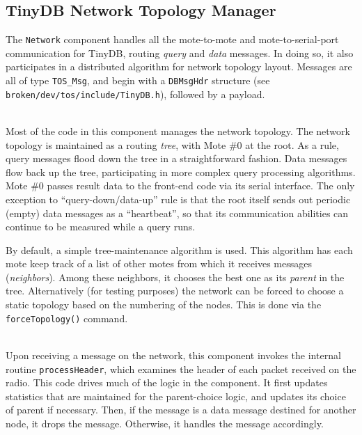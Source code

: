 \documentclass[11pt]{article}
\newcommand{\docroot}{broken/dev}
\begin{document}
\subsection{TinyDB Network Topology Manager}
\label{sec:tinydbnetwork}
The {\tt Network} component handles all the mote-to-mote and mote-to-serial-port
communication for TinyDB, routing {\em query} and {\em data} messages.
In doing so, it also participates in a distributed algorithm for
network topology layout.  Messages are all of type {\tt TOS\_Msg},
and begin with a {\tt DBMsgHdr} structure (see {\tt
\docroot/tos/include/TinyDB.h}), followed by a payload.

\vspace{1em}
\\ Most of the code in this
component manages the network topology.  The network topology is
maintained as a routing {\em tree}, with Mote \#0 at the root.  As a
rule, query messages flood down the tree in a straightforward fashion.
Data messages flow back up the tree, participating in more complex
query processing algorithms.  Mote \#0 passes result data to the
front-end code via its serial interface.  The only exception to
``query-down/data-up'' rule is that the root itself sends out periodic
(empty) data messages as a ``heartbeat'', so that its communication
abilities can continue to be measured while a query runs.

By default, a simple tree-maintenance algorithm is used.  This
algorithm has each mote keep track of a list of other motes from which
it receives messages ({\em neighbors}).  Among these neighbors, it
chooses the best one as its {\em parent} in the tree.  Alternatively
(for testing purposes) the network can be forced to choose a static
topology based on the numbering of the nodes.  This is done via the
{\tt forceTopology()} command.

\vspace{1em}
\\
Upon receiving a message on the network, this component invokes the
internal routine {\tt processHeader}, which examines the header of
each packet received on the radio.  This code drives much of the logic
in the component.  It first updates statistics that are maintained for
the parent-choice logic, and updates its choice of parent if
necessary.  Then, if the message is a data message destined for
another node, it drops the message.  Otherwise, it handles the message
accordingly.
\end{document}
